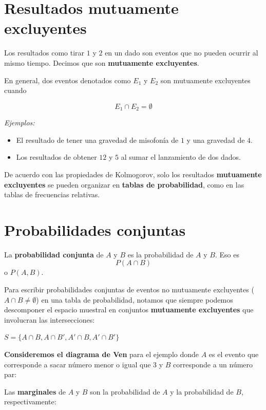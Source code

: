 \documentclass[
]{book}
\begin{document}
\hypertarget{resultados-mutuamente-excluyentes}{%
\section{Resultados mutuamente excluyentes}\label{resultados-mutuamente-excluyentes}}

Los resultados como tirar \(1\) y \(2\) en un dado son eventos que no pueden ocurrir al mismo tiempo. Decimos que son \textbf{mutuamente excluyentes}.

En general, dos eventos denotados como \(E_1\) y \(E_2\) son mutuamente excluyentes cuando

\[E_1\cap E_2=\emptyset\]

\emph{Ejemplos:}

\begin{itemize}
\item
  El resultado de tener una gravedad de misofonía de \(1\) y una gravedad de \(4\).
\item
  Los resultados de obtener \(12\) y \(5\) al sumar el lanzamiento de dos dados.
\end{itemize}

De acuerdo con las propiedades de Kolmogorov, solo los resultados \textbf{mutuamente excluyentes} se pueden organizar en \textbf{tablas de probabilidad}, como en las tablas de frecuencias relativas.

\hypertarget{probabilidades-conjuntas}{%
\section{Probabilidades conjuntas}\label{probabilidades-conjuntas}}

La \textbf{probabilidad conjunta} de \(A\) y \(B\) es la probabilidad de \(A\) y \(B\). Eso es \[P(A \cap B)\] o \(P(A,B)\).

Para escribir probabilidades conjuntas de eventos no mutuamente excluyentes (\(A \cap B \neq \emptyset\)) en una tabla de probabilidad, notamos que siempre podemos descomponer el espacio muestral en conjuntos \textbf{mutuamente excluyentes} que involucran las intersecciones:

\(S=\{A\cap B, A \cap B', A'\cap B, A'\cap B'\}\)

\textbf{Consideremos el diagrama de Ven} para el ejemplo donde \(A\) es el evento que corresponde a sacar número menor o igual que 3 y \(B\) corresponde a un número par:

Las \textbf{marginales} de \(A\) y \(B\) son la probabilidad de \(A\) y la probabilidad de \(B\), respectivamente:
\end{document}
